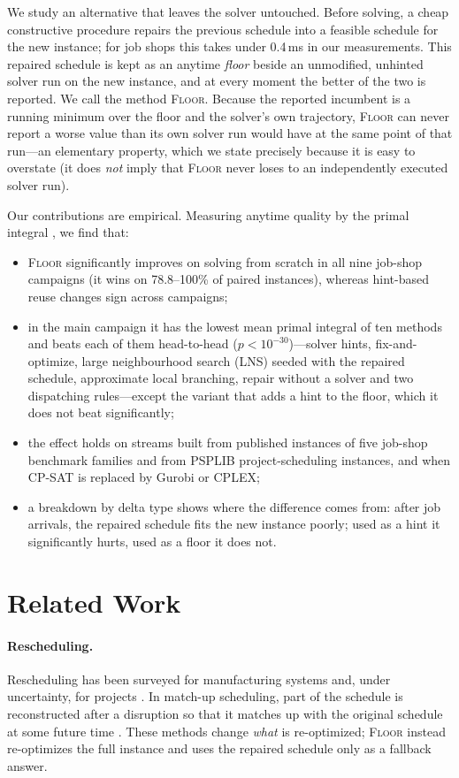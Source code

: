 \documentclass[letterpaper]{article} %
\newcommand{\mfloor}{\textsc{Floor}}
\begin{document}
We study an alternative that leaves the solver untouched. Before solving, a cheap constructive procedure repairs the previous schedule into a feasible schedule for the new instance; for job shops this takes under 0.4\,ms in our measurements. This repaired schedule is kept as an anytime \emph{floor} beside an unmodified, unhinted solver run on the new instance, and at every moment the better of the two is reported. We call the method \mfloor. Because the reported incumbent is a running minimum over the floor and the solver's own trajectory, \mfloor{} can never report a worse value than its own solver run would have at the same point of that run---an elementary property, which we state precisely because it is easy to overstate (it does \emph{not} imply that \mfloor{} never loses to an independently executed solver run).

Our contributions are empirical. Measuring anytime quality by the primal integral \citep{berthold2013}, we find that:
\begin{itemize}
\item \mfloor{} significantly improves on solving from scratch in all nine job-shop campaigns (it wins on 78.8--100\% of paired instances), whereas hint-based reuse changes sign across campaigns;
\item in the main campaign it has the lowest mean primal integral of ten methods and beats each of them head-to-head ($p < 10^{-30}$)---solver hints, fix-and-optimize, large neighbourhood search (LNS) seeded with the repaired schedule, approximate local branching, repair without a solver and two dispatching rules---except the variant that adds a hint to the floor, which it does not beat significantly;
\item the effect holds on streams built from published instances of five job-shop benchmark families and from PSPLIB project-scheduling instances, and when CP-SAT is replaced by Gurobi or CPLEX;
\item a breakdown by delta type shows where the difference comes from: after job arrivals, the repaired schedule fits the new instance poorly; used as a hint it significantly hurts, used as a floor it does not.
\end{itemize}

\section{Related Work}

\paragraph{Rescheduling.} Rescheduling has been surveyed for manufacturing systems \citep{vieira2003,ouelhadj2009} and, under uncertainty, for projects \citep{herroelen2005}. In match-up scheduling, part of the schedule is reconstructed after a disruption so that it matches up with the original schedule at some future time \citep{bean1991}. These methods change \emph{what} is re-optimized; \mfloor{} instead re-optimizes the full instance and uses the repaired schedule only as a fallback answer.
\end{document}
